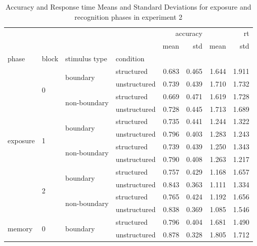 \begin{table}
    \centering
    \caption{Accuracy and Response time Means and Standard Deviations for exposure and recognition phases in experiment 2}    
    \label{tab:exp2-rt-accuracy-stats}
    \begin{tabular}{llllrrrr}
        \toprule
         &  &  &  & \multicolumn{2}{r}{accuracy} & \multicolumn{2}{r}{rt} \\
         &  &  &  & mean & std & mean & std \\
        phase & block & stimulus type & condition &  &  &  &  \\
        \midrule
        \multirow[t]{12}{*}{exposure} & \multirow[t]{4}{*}{0} & \multirow[t]{2}{*}{boundary} & structured & 0.683 & 0.465 & 1.644 & 1.911 \\
         &  &  & unstructured & 0.739 & 0.439 & 1.710 & 1.732 \\
        \cline{3-8}
         &  & \multirow[t]{2}{*}{non-boundary} & structured & 0.669 & 0.471 & 1.619 & 1.728 \\
         &  &  & unstructured & 0.728 & 0.445 & 1.713 & 1.689 \\
        \cline{2-8} \cline{3-8}
         & \multirow[t]{4}{*}{1} & \multirow[t]{2}{*}{boundary} & structured & 0.735 & 0.441 & 1.244 & 1.322 \\
         &  &  & unstructured & 0.796 & 0.403 & 1.283 & 1.243 \\
        \cline{3-8}
         &  & \multirow[t]{2}{*}{non-boundary} & structured & 0.739 & 0.439 & 1.250 & 1.343 \\
         &  &  & unstructured & 0.790 & 0.408 & 1.263 & 1.217 \\
        \cline{2-8} \cline{3-8}
         & \multirow[t]{4}{*}{2} & \multirow[t]{2}{*}{boundary} & structured & 0.757 & 0.429 & 1.168 & 1.657 \\
         &  &  & unstructured & 0.843 & 0.363 & 1.111 & 1.334 \\
        \cline{3-8}
         &  & \multirow[t]{2}{*}{non-boundary} & structured & 0.765 & 0.424 & 1.192 & 1.656 \\
         &  &  & unstructured & 0.838 & 0.369 & 1.085 & 1.546 \\
        \cline{1-8} \cline{2-8} \cline{3-8}
        \multirow[t]{18}{*}{memory} & \multirow[t]{6}{*}{0} & \multirow[t]{2}{*}{boundary} & structured & 0.796 & 0.404 & 1.681 & 1.490 \\
         &  &  & unstructured & 0.878 & 0.328 & 1.805 & 1.712 \\

\end{tabular}
\end{table}
